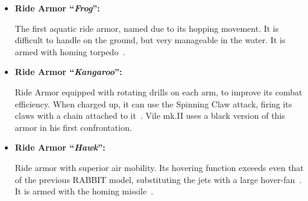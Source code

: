 \begin{itemize}
	\item \hypertarget{vehicle:Ride_Armor_Frog}{\textbf{Ride Armor ``\textit{Frog}'':}} The first aquatic ride armor, named due to its hopping movement. It is difficult to 
	handle on the ground, but very manageable in the water. It is armed with homing torpedo~\cite{wayback:X3_resources}.
	
	\item \hypertarget{vehicle:Ride_Armor_Kangaroo}{\textbf{Ride Armor ``\textit{Kangaroo}'':}} Ride Armor equipped with rotating drills on each arm, to improve its combat efficiency. When charged up, it can use the Spinning Claw attack, firing its claws with a chain attached to it~\cite{wayback:X3_resources,book:MH_field_guide}. Vile mk.II uses a black version of this armor in his first confrontation.
	
	\item \hypertarget{vehicle:Ride_Armor_Hawk}{\textbf{Ride Armor ``\textit{Hawk}'':}} Ride armor with superior air mobility. Its hovering function exceeds even that of the previous RABBIT model, substituting the jets with a large hover-fan~\cite{book:MH_field_guide}. It is armed with the homing missile~\cite{wayback:X3_resources}.
	

\end{itemize}

